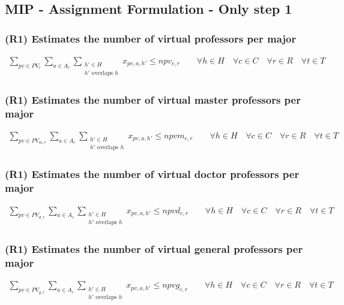\subsection{MIP - Assignment Formulation - Only step 1}

\subsubsection{(R1) Estimates the number of virtual professors per major}
\begin{eqnarray}
\sum\limits_{pv \in PV_{r}}\sum\limits_{a \in A_{c}}\sum\limits_{\substack {h' \in H \\ h'\mbox{ overlaps }h}} x_{pv,a,h'} \le npv_{c,r} \nonumber \qquad 
\forall h \in H \quad
\forall c \in C \quad
\forall r \in R \quad
\forall t \in T
\end{eqnarray}

\subsubsection{(R1) Estimates the number of virtual master professors per major}
\begin{eqnarray}
\sum\limits_{pv \in PV_{m,r}}\sum\limits_{a \in A_{c}}\sum\limits_{\substack {h' \in H \\ h'\mbox{ overlaps }h}} x_{pv,a,h'} \le npvm_{c,r} \nonumber \qquad 
\forall h \in H \quad
\forall c \in C \quad
\forall r \in R \quad
\forall t \in T
\end{eqnarray}

\subsubsection{(R1) Estimates the number of virtual doctor professors per major}
\begin{eqnarray}
\sum\limits_{pv \in PV_{d,r}}\sum\limits_{a \in A_{c}}\sum\limits_{\substack {h' \in H \\ h'\mbox{ overlaps }h}} x_{pv,a,h'} \le npvd_{c,r} \nonumber \qquad 
\forall h \in H \quad
\forall c \in C \quad
\forall r \in R \quad
\forall t \in T
\end{eqnarray}

\subsubsection{(R1) Estimates the number of virtual general professors per major}
\begin{eqnarray}
\sum\limits_{pv \in PV_{g,r}}\sum\limits_{a \in A_{c}}\sum\limits_{\substack {h' \in H \\ h'\mbox{ overlaps }h}} x_{pv,a,h'} \le npvg_{c,r} \nonumber \qquad 
\forall h \in H \quad
\forall c \in C \quad
\forall r \in R \quad
\forall t \in T
\end{eqnarray}

